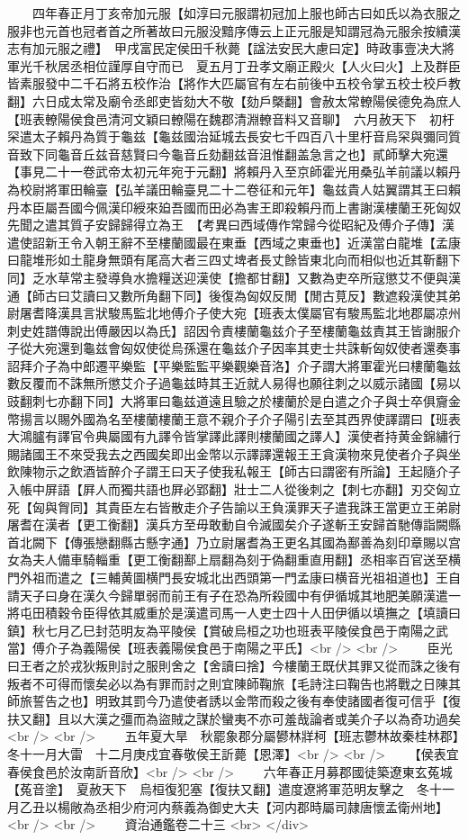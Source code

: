 　　四年春正月丁亥帝加元服【如淳曰元服謂初冠加上服也師古曰如氏以為衣服之服非也元首也冠者首之所著故曰元服没黯序傳云上正元服是知謂冠為元服余按續漢志有加元服之禮】　甲戌富民定侯田千秋薨【諡法安民大慮曰定】時政事壹决大將軍光千秋居丞相位謹厚自守而已　夏五月丁丑孝文廟正殿火【人火曰火】上及群臣皆素服發中二千石將五校作治【將作大匹屬官有左右前後中五校令掌五校士校戶教翻】六日成太常及廟令丞郎吏皆劾大不敬【劾戶槩翻】會赦太常轑陽侯德免為庶人【班表轑陽侯食邑清河文穎曰轑陽在魏郡清淵轑音料又音聊】　六月赦天下　初杅罙遣太子賴丹為質于龜兹【龜兹國治延城去長安七千四百八十里杅音烏罙與彌同質音致下同龜音丘兹音慈賢曰今龜音丘劾翻兹音沮惟翻盖急言之也】貳師擊大宛還【事見二十一卷武帝太初元年宛于元翻】將賴丹入至京師霍光用桑弘羊前議以賴丹為校尉將軍田輪臺【弘羊議田輪臺見二十二卷征和元年】龜兹貴人姑翼謂其王曰賴丹本臣屬吾國今佩漢印綬來廹吾國而田必為害王即殺賴丹而上書謝漢樓蘭王死匈奴先聞之遣其質子安歸歸得立為王　【考異曰西域傳作常歸今從昭紀及傅介子傳】漢遣使詔新王令入朝王辭不至樓蘭國最在東垂【西域之東垂也】近漢當白龍堆【孟康曰龍堆形如土龍身無頭有尾高大者三四丈埤者長丈餘皆東北向而相似也近其靳翻下同】乏水草常主發導負水擔糧送迎漢使【擔都甘翻】又數為吏卒所寇懲艾不便與漢通【師古曰艾讀曰又數所角翻下同】後復為匈奴反閒【閒古莧反】數遮殺漢使其弟尉屠耆降漢具言狀駿馬監北地傅介子使大宛【班表太僕屬官有駿馬監北地郡屬凉州刺史姓譜傳說出傅嚴因以為氏】詔因令責樓蘭龜兹介子至樓蘭龜兹責其王皆謝服介子從大宛還到龜兹會匈奴使從烏孫還在龜兹介子因率其吏士共誅斬匈奴使者還奏事詔拜介子為中郎遷平樂監【平樂監監平樂觀樂音洛】介子謂大將軍霍光曰樓蘭龜兹數反覆而不誅無所懲艾介子過龜兹時其王近就人易得也願往刺之以威示諸國【易以豉翻刺七亦翻下同】大將軍曰龜兹道遠且驗之於樓蘭於是白遣之介子與士卒俱齎金幣揚言以賜外國為名至樓蘭樓蘭王意不親介子介子陽引去至其西界使譯謂曰【班表大鴻臚有譯官令典屬國有九譯令皆掌譯此譯則樓蘭國之譯人】漢使者持黄金錦繡行賜諸國王不來受我去之西國矣即出金幣以示譯譯還報王王貪漢物來見使者介子與坐飲陳物示之飲酒皆醉介子謂王曰天子使我私報王【師古曰謂密有所論】王起隨介子入帳中屏語【屛人而獨共語也屛必郢翻】壯士二人從後刺之【刺七亦翻】刃交匈立死【匈與胷同】其貴臣左右皆散走介子告諭以王負漢罪天子遣我誅王當更立王弟尉屠耆在漢者【更工衡翻】漢兵方至毋敢動自令滅國矣介子遂斬王安歸首馳傳詣闕縣首北闕下【傳張戀翻縣古懸字通】乃立尉屠耆為王更名其國為鄯善為刻印章賜以宫女為夫人備車騎輜重【更工衡翻鄯上扇翻為刻于偽翻重直用翻】丞相率百官送至横門外祖而遣之【三輔黄圖横門長安城北出西頭第一門孟康曰横音光祖祖道也】王自請天子曰身在漢久今歸單弱而前王有子在恐為所殺國中有伊循城其地肥美願漢遣一將屯田積穀令臣得依其威重於是漢遣司馬一人吏士四十人田伊循以填撫之【填讀曰鎮】秋七月乙巳封范明友為平陵侯【賞破烏桓之功也班表平陵侯食邑于南陽之武當】傅介子為義陽侯【班表義陽侯食邑于南陽之平氏】<br />
<br />
　　臣光曰王者之於戎狄叛則討之服則舍之【舍讀曰捨】今樓蘭王既伏其罪又從而誅之後有叛者不可得而懷矣必以為有罪而討之則宜陳師鞠旅【毛詩注曰鞠告也將戰之日陳其師旅誓告之也】明致其罰今乃遣使者誘以金幣而殺之後有奉使諸國者復可信乎【復扶又翻】且以大漢之彊而為盜賊之謀於蠻夷不亦可羞哉論者或美介子以為奇功過矣<br />
<br />
　　五年夏大旱　秋罷象郡分屬鬰林牂柯【班志鬱林故秦桂林郡】冬十一月大雷　十二月庚戍宜春敬侯王訢薨【恩澤】<br />
<br />
　　【侯表宜春侯食邑於汝南訢音欣】<br />
<br />
　　六年春正月募郡國徒築遼東玄菟城【菟音塗】　夏赦天下　烏桓復犯塞【復扶又翻】遣度遼將軍范明友擊之　冬十一月乙丑以楊敞為丞相少府河内蔡義為御史大夫【河内郡時屬司隷唐懷孟衛州地】<br />
<br />
　　資治通鑑卷二十三  <br>
   </div> 

